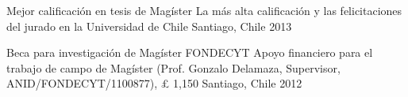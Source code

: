 \vspace{1mm}

\begin{cvhonors}
\cvhonor
{Mejor calificación en tesis de Magíster}
{La más alta calificación y las felicitaciones del jurado en la Universidad de Chile}
{Santiago, Chile}
{2013}
\end{cvhonors}

\vspace{1mm}

\begin{cvhonors}
\cvhonor
{Beca para investigación de Mag\'ister FONDECYT}
{Apoyo financiero para el trabajo de campo de Magíster (Prof. Gonzalo Delamaza, Supervisor, ANID/FONDECYT/1100877), {\pounds} 1,150}
{Santiago, Chile}
{2012}
\end{cvhonors}

\vspace{1mm}
